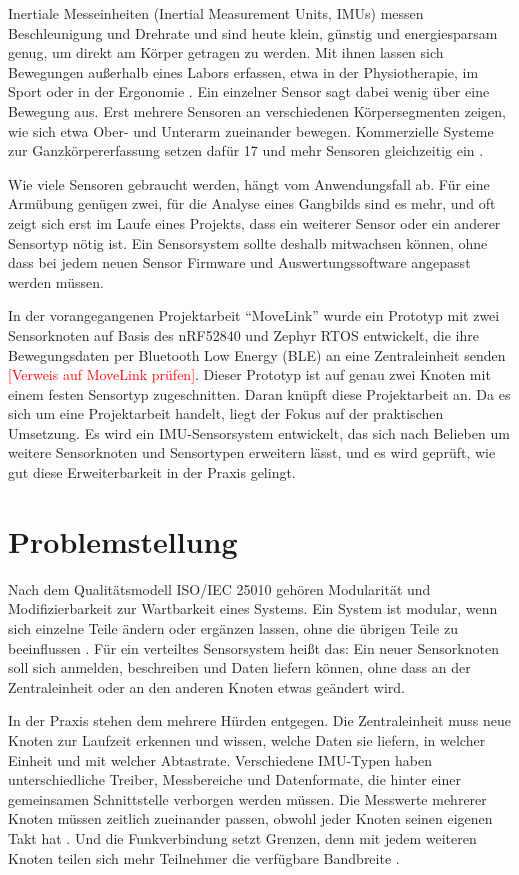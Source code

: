 \documentclass[11pt, a4paper]{article}
\newcommand{\offen}[1]{\textcolor{red}{[#1]}}
\begin{document}
Inertiale Messeinheiten (Inertial Measurement Units, IMUs) messen Beschleunigung und Drehrate und sind heute klein, günstig und energiesparsam genug, um direkt am Körper getragen zu werden. Mit ihnen lassen sich Bewegungen außerhalb eines Labors erfassen, etwa in der Physiotherapie, im Sport oder in der Ergonomie \cite{filippeschi2017survey}. Ein einzelner Sensor sagt dabei wenig über eine Bewegung aus. Erst mehrere Sensoren an verschiedenen Körpersegmenten zeigen, wie sich etwa Ober- und Unterarm zueinander bewegen. Kommerzielle Systeme zur Ganzkörpererfassung setzen dafür 17 und mehr Sensoren gleichzeitig ein \cite{roetenberg2009xsens}.

Wie viele Sensoren gebraucht werden, hängt vom Anwendungsfall ab. Für eine Armübung genügen zwei, für die Analyse eines Gangbilds sind es mehr, und oft zeigt sich erst im Laufe eines Projekts, dass ein weiterer Sensor oder ein anderer Sensortyp nötig ist. Ein Sensorsystem sollte deshalb mitwachsen können, ohne dass bei jedem neuen Sensor Firmware und Auswertungssoftware angepasst werden müssen.

In der vorangegangenen Projektarbeit \enquote{MoveLink} wurde ein Prototyp mit zwei Sensorknoten auf Basis des nRF52840 und Zephyr RTOS entwickelt, die ihre Bewegungsdaten per Bluetooth Low Energy (BLE) an eine Zentraleinheit senden \offen{Verweis auf MoveLink prüfen}. Dieser Prototyp ist auf genau zwei Knoten mit einem festen Sensortyp zugeschnitten. Daran knüpft diese Projektarbeit an. Da es sich um eine Projektarbeit handelt, liegt der Fokus auf der praktischen Umsetzung. Es wird ein IMU-Sensorsystem entwickelt, das sich nach Belieben um weitere Sensorknoten und Sensortypen erweitern lässt, und es wird geprüft, wie gut diese Erweiterbarkeit in der Praxis gelingt.

\section{Problemstellung}

Nach dem Qualitätsmodell ISO/IEC 25010 \cite{iso25010} gehören Modularität und Modifizierbarkeit zur Wartbarkeit eines Systems. Ein System ist modular, wenn sich einzelne Teile ändern oder ergänzen lassen, ohne die übrigen Teile zu beeinflussen \cite{parnas1972criteria}. Für ein verteiltes Sensorsystem heißt das: Ein neuer Sensorknoten soll sich anmelden, beschreiben und Daten liefern können, ohne dass an der Zentraleinheit oder an den anderen Knoten etwas geändert wird.

In der Praxis stehen dem mehrere Hürden entgegen. Die Zentraleinheit muss neue Knoten zur Laufzeit erkennen und wissen, welche Daten sie liefern, in welcher Einheit und mit welcher Abtastrate. Verschiedene IMU-Typen haben unterschiedliche Treiber, Messbereiche und Datenformate, die hinter einer gemeinsamen Schnittstelle verborgen werden müssen. Die Messwerte mehrerer Knoten müssen zeitlich zueinander passen, obwohl jeder Knoten seinen eigenen Takt hat \cite{elson2002rbs,maroti2004ftsp}. Und die Funkverbindung setzt Grenzen, denn mit jedem weiteren Knoten teilen sich mehr Teilnehmer die verfügbare Bandbreite \cite{bt_core}.
\end{document}

